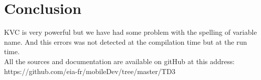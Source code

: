 \documentclass[a4paper,10pt]{article}
\begin{document}
				\section{Conclusion}	
				KVC is very powerful but we have had some problem with the spelling of variable name. And this errors was not detected at the compilation time but at the run time.\\
				All the sources and documentation are available on gitHub at this address: \\ https://github.com/eia-fr/mobileDev/tree/master/TD3
\end{document}
